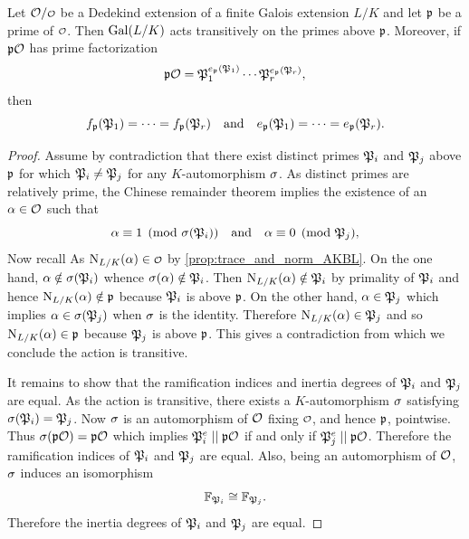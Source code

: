     \begin{proposition}\label{prop:Galois_action_on_primes_is_transitive}
      Let \(\mc{O}/\smc{O}\) be a Dedekind extension of a finite Galois extension \(L/K\) and let \(\mathfrak{p}\) be a prime of \(\smc{O}\). Then \(\operatorname{\mathrm{Gal}}(L/K)\) acts transitively on the primes above \(\mathfrak{p}\). Moreover, if \(\mathfrak{p}\mathcal{O}\) has prime factorization
      \[
        \mathfrak{p}\mathcal{O} = \mathfrak{P}_{1}^{e_{\mathfrak{p}}(\mathfrak{P}_{1})} \cdots \mathfrak{P}_{r}^{e_{\mathfrak{p}}(\mathfrak{P}_{r})},
      \]
      then
      \[
        f_{\mathfrak{p}}(\mathfrak{P}_{1}) = \cdots = f_{\mathfrak{p}}(\mathfrak{P}_{r}) \quad \text{and} \quad e_{\mathfrak{p}}(\mathfrak{P}_{1}) = \cdots = e_{\mathfrak{p}}(\mathfrak{P}_{r}).
      \]
    \end{proposition}
    \begin{proof}
      Assume by contradiction that there exist distinct primes \(\mathfrak{P}_{i}\) and \(\mathfrak{P}_{j}\) above \(\mathfrak{p}\) for which \(\mathfrak{P}_{i} \neq \mathfrak{P}_{j}\) for any \(K\)-automorphism \(\sigma\). As distinct primes are relatively prime, the Chinese remainder theorem implies the existence of an \(\alpha \in \mathcal{O}\) such that
      \[
        \alpha \equiv 1 \pmod{\sigma(\mathfrak{P}_{i})} \quad \text{and} \quad \alpha \equiv 0 \pmod{\mathfrak{P}_{j}},
      \]
      Now recall As \(\Norm_{L/K}(\a) \in \smc{O}\) by \cref{prop:trace_and_norm_AKBL}. On the one hand, \(\alpha \notin \sigma(\mathfrak{P}_{i})\) whence \(\sigma(\alpha) \notin \mathfrak{P}_{i}\). Then \(\operatorname{\mathrm{N}}_{L/K}(\alpha) \notin \mathfrak{P}_{i}\) by primality of \(\mathfrak{P}_{i}\) and hence \(\operatorname{\mathrm{N}}_{L/K}(\alpha) \notin \mathfrak{p}\) because \(\mathfrak{P}_{i}\) is above \(\mathfrak{p}\). On the other hand, \(\alpha \in \mathfrak{P}_{j}\) which implies \(\alpha \in \sigma(\mathfrak{P}_{j})\) when \(\sigma\) is the identity. Therefore \(\operatorname{\mathrm{N}}_{L/K}(\alpha) \in \mathfrak{P}_{j}\) and so \(\operatorname{\mathrm{N}}_{L/K}(\alpha) \in \mathfrak{p}\) because \(\mathfrak{P}_{j}\) is above \(\mathfrak{p}\). This gives a contradiction from which we conclude the action is transitive. 
      
      It remains to show that the ramification indices and inertia degrees of \(\mathfrak{P}_{i}\) and \(\mathfrak{P}_{j}\) are equal. As the action is transitive, there exists a \(K\)-automorphism \(\sigma\) satisfying \(\sigma(\mathfrak{P}_{i}) = \mathfrak{P}_{j}\). Now \(\sigma\) is an automorphism of \(\mathcal{O}\) fixing \(\smc{O}\), and hence \(\mathfrak{p}\), pointwise. Thus \(\sigma(\mathfrak{p}\mathcal{O}) = \mathfrak{p}\mathcal{O}\) which implies \(\mathfrak{P}_{i}^{e} \mid\mid \mathfrak{p}\mathcal{O}\) if and only if \(\mathfrak{P}_{j}^{e} \mid\mid \mathfrak{p}\mathcal{O}\). Therefore the ramification indices of \(\mathfrak{P}_{i}\) and \(\mathfrak{P}_{j}\) are equal. Also, being an automorphism of \(\mathcal{O}\), \(\sigma\) induces an isomorphism
      \[
        \mathbb{F}_{\mathfrak{P}_{i}} \cong \mathbb{F}_{\mathfrak{P}_{j}}.
      \]
      Therefore the inertia degrees of \(\mathfrak{P}_{i}\) and \(\mathfrak{P}_{j}\) are equal.
    \end{proof}

